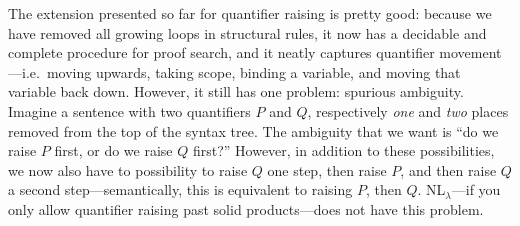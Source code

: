 The extension presented so far for quantifier raising is pretty good:
because we have removed all growing loops in structural rules, it now
has a decidable and complete procedure for proof search, and it neatly
captures quantifier movement---i.e.\ moving upwards, taking scope,
binding a variable, and moving that variable back down. However, it
still has one problem: spurious ambiguity. Imagine a sentence with two
quantifiers $P$ and $Q$, respectively \emph{one} and \emph{two} places
removed from the top of the syntax tree. The ambiguity that we want is
``do we raise $P$ first, or do we raise $Q$ first?'' However, in
addition to these possibilities, we now also have to possibility to
raise $Q$ one step, then raise $P$, and then raise $Q$ a second
step---semantically, this is equivalent to raising $P$, then
$Q$. NL$_\lambda$---if you only allow quantifier raising past solid
products---does not have this problem.

